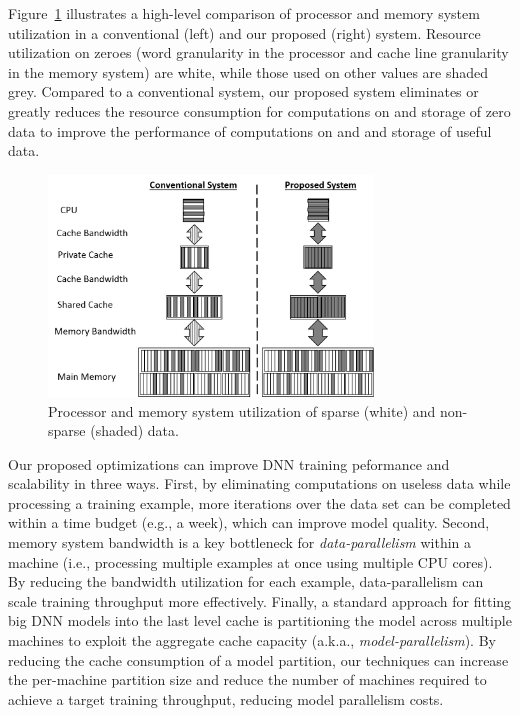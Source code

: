 
Figure~\ref{fig:system-compare} illustrates a high-level comparison of processor and memory system utilization in a conventional (left) and our proposed (right) system.  Resource utilization on zeroes (word granularity in the processor and cache line granularity in the memory system) are white, while those used on other values are shaded grey. Compared to a conventional system, our proposed system eliminates or greatly reduces the resource consumption for computations on and storage of zero data to improve the performance of computations on and and storage of useful data. 

\begin{figure}[h]
\centering
\includegraphics[width=3.4in]{Figures/system-comparison.png}
\caption{Processor and memory system utilization of sparse (white) and non-sparse (shaded) data.}
\label{fig:system-compare}
\end{figure}

Our proposed optimizations can improve DNN training peformance and scalability in three ways.  First, by eliminating computations on useless data while processing a training example, more iterations over the data set can be completed within a time budget (e.g., a week), which can improve model quality.  Second,  memory system  bandwidth is a key bottleneck for {\it data-parallelism} within a machine (i.e., processing multiple examples at once using multiple CPU cores). By reducing the bandwidth utilization for each example, data-parallelism can scale training throughput more effectively.  Finally, a standard approach for fitting big DNN models into the last level cache is partitioning the model across multiple machines to exploit the aggregate cache capacity (a.k.a., {\it model-parallelism}). By reducing the cache consumption of a model partition, our techniques can increase the per-machine partition size and reduce the number of machines required to achieve a target training throughput, reducing model parallelism costs. 

